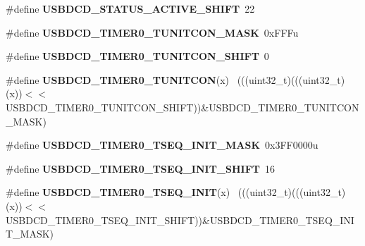 \begin{DoxyCompactItemize}
\item 
\hypertarget{group___u_s_b_d_c_d___register___masks_ga77f2a6e381b526f9d70e13cdf21332a5}{}\#define {\bfseries U\+S\+B\+D\+C\+D\+\_\+\+S\+T\+A\+T\+U\+S\+\_\+\+A\+C\+T\+I\+V\+E\+\_\+\+S\+H\+I\+F\+T}~22\label{group___u_s_b_d_c_d___register___masks_ga77f2a6e381b526f9d70e13cdf21332a5}

\item 
\hypertarget{group___u_s_b_d_c_d___register___masks_ga21cf0206b969eecd876b5b612ca33f9e}{}\#define {\bfseries U\+S\+B\+D\+C\+D\+\_\+\+T\+I\+M\+E\+R0\+\_\+\+T\+U\+N\+I\+T\+C\+O\+N\+\_\+\+M\+A\+S\+K}~0x\+F\+F\+Fu\label{group___u_s_b_d_c_d___register___masks_ga21cf0206b969eecd876b5b612ca33f9e}

\item 
\hypertarget{group___u_s_b_d_c_d___register___masks_ga4a35e4b1c280e2a888b8505ab2009370}{}\#define {\bfseries U\+S\+B\+D\+C\+D\+\_\+\+T\+I\+M\+E\+R0\+\_\+\+T\+U\+N\+I\+T\+C\+O\+N\+\_\+\+S\+H\+I\+F\+T}~0\label{group___u_s_b_d_c_d___register___masks_ga4a35e4b1c280e2a888b8505ab2009370}

\item 
\hypertarget{group___u_s_b_d_c_d___register___masks_ga29c0ca2905f7731731856f8c22343dfe}{}\#define {\bfseries U\+S\+B\+D\+C\+D\+\_\+\+T\+I\+M\+E\+R0\+\_\+\+T\+U\+N\+I\+T\+C\+O\+N}(x)                            ~(((uint32\+\_\+t)(((uint32\+\_\+t)(x))$<$$<$U\+S\+B\+D\+C\+D\+\_\+\+T\+I\+M\+E\+R0\+\_\+\+T\+U\+N\+I\+T\+C\+O\+N\+\_\+\+S\+H\+I\+F\+T))\&U\+S\+B\+D\+C\+D\+\_\+\+T\+I\+M\+E\+R0\+\_\+\+T\+U\+N\+I\+T\+C\+O\+N\+\_\+\+M\+A\+S\+K)\label{group___u_s_b_d_c_d___register___masks_ga29c0ca2905f7731731856f8c22343dfe}

\item 
\hypertarget{group___u_s_b_d_c_d___register___masks_ga2310e6984a2a488e960ca824ddce9ffc}{}\#define {\bfseries U\+S\+B\+D\+C\+D\+\_\+\+T\+I\+M\+E\+R0\+\_\+\+T\+S\+E\+Q\+\_\+\+I\+N\+I\+T\+\_\+\+M\+A\+S\+K}~0x3\+F\+F0000u\label{group___u_s_b_d_c_d___register___masks_ga2310e6984a2a488e960ca824ddce9ffc}

\item 
\hypertarget{group___u_s_b_d_c_d___register___masks_gaa7db9a795f782afd4b38408bc23b4b49}{}\#define {\bfseries U\+S\+B\+D\+C\+D\+\_\+\+T\+I\+M\+E\+R0\+\_\+\+T\+S\+E\+Q\+\_\+\+I\+N\+I\+T\+\_\+\+S\+H\+I\+F\+T}~16\label{group___u_s_b_d_c_d___register___masks_gaa7db9a795f782afd4b38408bc23b4b49}

\item 
\hypertarget{group___u_s_b_d_c_d___register___masks_gac83ce9f8ef28aaac3478f3db9100926c}{}\#define {\bfseries U\+S\+B\+D\+C\+D\+\_\+\+T\+I\+M\+E\+R0\+\_\+\+T\+S\+E\+Q\+\_\+\+I\+N\+I\+T}(x)                          ~(((uint32\+\_\+t)(((uint32\+\_\+t)(x))$<$$<$U\+S\+B\+D\+C\+D\+\_\+\+T\+I\+M\+E\+R0\+\_\+\+T\+S\+E\+Q\+\_\+\+I\+N\+I\+T\+\_\+\+S\+H\+I\+F\+T))\&U\+S\+B\+D\+C\+D\+\_\+\+T\+I\+M\+E\+R0\+\_\+\+T\+S\+E\+Q\+\_\+\+I\+N\+I\+T\+\_\+\+M\+A\+S\+K)\label{group___u_s_b_d_c_d___register___masks_gac83ce9f8ef28aaac3478f3db9100926c}


\end{DoxyCompactItemize}
